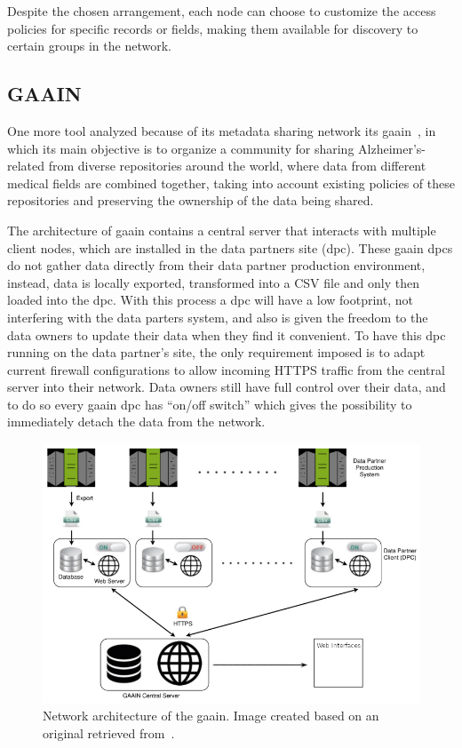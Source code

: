 Despite the chosen arrangement, each node can choose to customize the access policies for specific records or fields, making them available for discovery to certain groups in the network.

\subsection*{GAAIN}
One more tool analyzed because of its metadata sharing network its \gls{gaain}~\cite{gaain}, in which its main objective is to organize a community for sharing Alzheimer's-related from diverse repositories around the world, where data from different medical fields are combined together, taking into account existing policies of these repositories and preserving the ownership of the data being shared.

The architecture of \gls{gaain} contains a central server that interacts with multiple client nodes, which are installed in the data partners site (\gls{dpc}).
These \gls{gaain} \gls{dpc}s do not gather data directly from their data partner production environment, instead, data is locally exported, transformed into a CSV file and only then loaded into the \gls{dpc}.
With this process a \gls{dpc} will have a low footprint, not interfering with the data parters system, and also is given the freedom to the data owners to update their data when they find it convenient.
To have this \gls{dpc} running on the data partner's site, the only requirement imposed is to adapt current firewall configurations to allow incoming HTTPS traffic from the central server into their network.
Data owners still have full control over their data, and to do so every \gls{gaain} \gls{dpc} has ``on/off switch'' which gives the possibility to immediately detach the data from the network.

\begin{figure}[H]
    \centering
    \includegraphics[width=.7\linewidth]{gaain.png}
    \caption{Network architecture of the \gls{gaain}. Image created based on an original retrieved from~\cite{gaain}.}
\end{figure}


